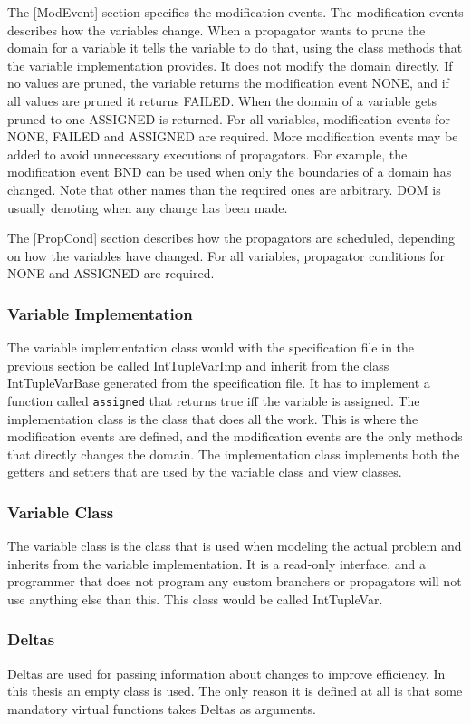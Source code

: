 \documentclass[a4paper,11pt]{article}
\begin{document}
The [ModEvent] section specifies the modification events. The modification events describes how the variables change. When a propagator wants to prune the domain for a variable it tells the variable to do that, using the class methods that the variable implementation provides. It does not modify the domain directly. If no values are pruned, the variable returns the modification event NONE, and if all values are pruned it returns FAILED. When the domain of a variable gets pruned to one ASSIGNED is returned. For all variables, modification events for NONE, FAILED and ASSIGNED are required. More modification events may be added to avoid unnecessary executions of propagators. For example, the modification event BND can be used when only the boundaries of a domain has changed. Note that other names than the required ones are arbitrary. DOM is usually denoting when any change has been made.

The [PropCond] section describes how the propagators are scheduled, depending on how the variables have changed. For all variables, propagator conditions for NONE and ASSIGNED are required.

\subsubsection{Variable Implementation}
The variable implementation class would with the specification file in the previous section be called IntTupleVarImp and inherit from the class IntTupleVarBase generated from the specification file. It has to implement a function called \texttt{assigned} that returns true iff the variable is assigned. The implementation class is the class that does all the work. This is where the modification events are defined, and the modification events are the only methods that directly changes the domain. The implementation class implements both the getters and setters that are used by the variable class and view classes.

\subsubsection{Variable Class}
The variable class is the class that is used when modeling the actual problem and inherits from the variable implementation. It is a read-only interface, and a programmer that does not program any custom branchers or propagators will not use anything else than this. This class would be called IntTupleVar.

\subsubsection{Deltas}
Deltas are used for passing information about changes to improve efficiency. In this thesis an empty class is used. The only reason it is defined at all is that some mandatory virtual functions takes Deltas as arguments.
\end{document}
